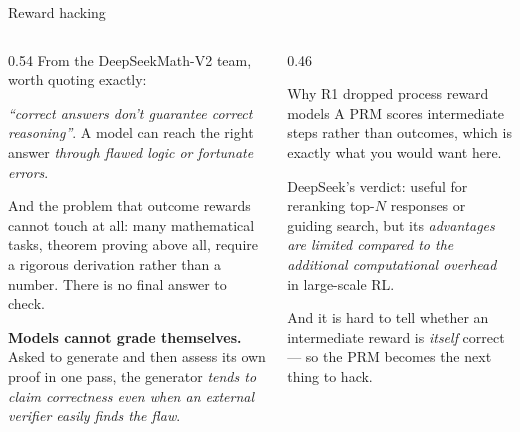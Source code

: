 \documentclass[aspectratio=169,10pt]{beamer}
\begin{document}
\iffalse
\begin{frame}[shrink=14]{Reward hacking}
  \begin{columns}[T]
    \begin{column}{0.54\textwidth}
      From the DeepSeekMath-V2 team, worth quoting exactly:
      \vspace{0.3em}

      \textit{``correct answers don't guarantee correct reasoning''}. A model
      can reach the right answer \emph{through flawed logic or fortunate
      errors}.
      \vspace{0.5em}

      And the problem that outcome rewards cannot touch at all: many
      mathematical tasks, theorem proving above all, require a rigorous
      derivation rather than a number. There is no final answer to check.
      \vspace{0.5em}

      \textbf{Models cannot grade themselves.} Asked to generate and then
      assess its own proof in one pass, the generator \emph{tends to claim
      correctness even when an external verifier easily finds the flaw}.
    \end{column}
    \begin{column}{0.46\textwidth}
      \begin{block}{Why R1 dropped process reward models}
        \small
        A PRM scores intermediate steps rather than outcomes, which is exactly
        what you would want here.
        \vspace{0.3em}

        DeepSeek's verdict: useful for reranking top-$N$ responses or guiding
        search, but its \emph{advantages are limited compared to the additional
        computational overhead} in large-scale RL.
        \vspace{0.3em}

        And it is hard to tell whether an intermediate reward is \emph{itself}
        correct --- so the PRM becomes the next thing to hack.
      \end{block}
    \end{column}
  \end{columns}
\end{frame}
\end{document}
